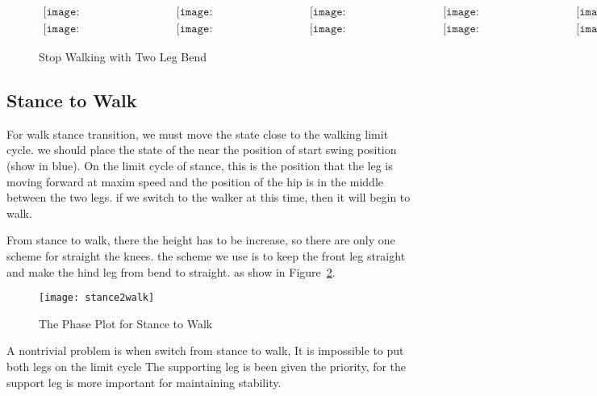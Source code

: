 \begin{figure}[!htbp]
  \begin{center}
        $\begin{array}{ccccc}
\texttt{[image: WalkStanceTransition/0001.eps]}&
\texttt{[image: WalkStanceTransition/0101.eps]}&
\texttt{[image: WalkStanceTransition/0201.eps]}&
\texttt{[image: WalkStanceTransition/0301.eps]}&
\texttt{[image: WalkStanceTransition/0401.eps]}
\\
\texttt{[image: WalkStanceTransition/0501.eps]}&
\texttt{[image: WalkStanceTransition/0601.eps]}&
\texttt{[image: WalkStanceTransition/0701.eps]}&
\texttt{[image: WalkStanceTransition/0801.eps]}&
\texttt{[image: WalkStanceTransition/0901.eps]}
\end{array}$
      
    \caption{Stop Walking with Two Leg Bend}
    \label{fig:walkstancestraight}
\end{center}
\end{figure}



\subsection{Stance to Walk}
For walk stance transition, we must move the state close to the walking limit cycle.
we should place the state of the near the position of start swing position (show in blue).
On the limit cycle of stance, this is the position that the leg is moving forward at maxim speed and the position of the hip is in the middle between the two legs.
if we switch to the walker at this time, then it will begin to walk.



From stance to walk, there the height has to be increase, so there are only one scheme for straight the knees.
the scheme we use is to keep the front leg straight and make the hind leg from bend to straight.
as show in Figure~\ref{fig:stance2walk}.
\begin{figure}[!htbp]
  \begin{center}
     \texttt{[image: stance2walk]}
    \caption{The Phase Plot for Stance to Walk}
    \label{fig:stance2walk}
\end{center}
\end{figure}


A nontrivial problem is when switch from stance to walk, 
It is impossible to put both legs on the limit cycle
The supporting leg is been given the priority, for the support leg is more important for maintaining stability.





